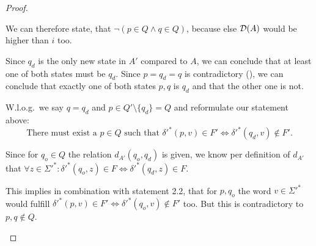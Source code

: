 \begin{proof}
\begin{description}
		
		We can therefore state, that $\neg(p \in Q \land q \in Q)$, because else $\mathcal{D}(A)$ would be higher than $i$ too. 
		
		Since $q_d$ is the only new state in $A'$ compared to $A$, we can conclude that at least one of both states must be $q_d$. Since $p = q_d = q$ is contradictory (), we can conclude that exactly one of both states $p, q$ is $q_d$ and that the other one is not.
		
		W.l.o.g.\ we say $q = q_d$ and $p \in Q' \setminus \{q_d\} = Q$ and reformulate our statement above:
		\begin{equation}
		\text{There must exist a }p \in Q\text{ such that }\delta'^*(p,v) \in F' \Leftrightarrow \delta'^*(q_d,v) \notin F'.
		\end{equation}
		
		
		Since for $q_o \in Q$ the relation $d_{A'}(q_o, q_d)$ is given, we know per definition of $d_{A'}$ that $\forall z\in\Sigma'^*\colon \delta'^*(q_o,z) \in F \Leftrightarrow \delta'^*(q_d,z) \in F$.
		
		This implies in combination with statement 2.2, that for $p,q_o$ the word $v\in\Sigma'^*$ would fulfill $\delta'^*(p,v) \in F' \Leftrightarrow \delta'^*(q_o,v) \notin F'$ too. But this is contradictory to $p,q \notin Q$.
		
		
	\end{description}
\end{proof}


